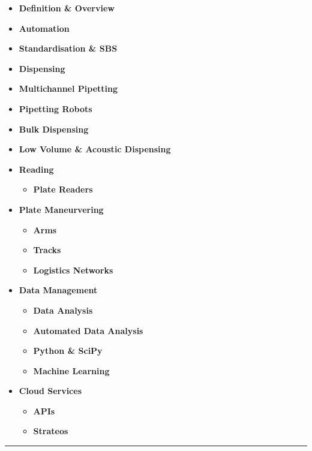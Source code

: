 \begin{itemize}
\tightlist
\item
  \textbf{Definition \& Overview}
\item
  \textbf{Automation}
\item
  \textbf{Standardisation \& SBS}
\item
  \textbf{Dispensing}
\item
  \textbf{Multichannel Pipetting}
\item
  \textbf{Pipetting Robots}
\item
  \textbf{Bulk Dispensing}
\item
  \textbf{Low Volume \& Acoustic Dispensing}
\item
  \textbf{Reading}

  \begin{itemize}
  \tightlist
  \item
    \textbf{Plate Readers}
  \end{itemize}
\item
  \textbf{Plate Maneurvering}

  \begin{itemize}
  \tightlist
  \item
    \textbf{Arms}
  \item
    \textbf{Tracks}
  \item
    \textbf{Logistics Networks}
  \end{itemize}
\item
  \textbf{Data Management}

  \begin{itemize}
  \tightlist
  \item
    \textbf{Data Analysis}
  \item
    \textbf{Automated Data Analysis}
  \item
    \textbf{Python \& SciPy}
  \item
    \textbf{Machine Learning}
  \end{itemize}
\item
  \textbf{Cloud Services}

  \begin{itemize}
  \tightlist
  \item
    \textbf{APIs}
  \item
    \textbf{Strateos}
  \end{itemize}
\end{itemize}

\begin{center}\rule{0.5\linewidth}{0.5pt}\end{center}


